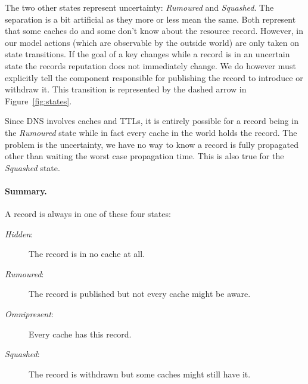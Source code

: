 \documentclass[twoside,english, a4paper]{article}
\newcommand{\powerset}{\mathopen{\mathbb{P}}\ensuremath{\,}}
\begin{document}
The two other states represent uncertainty: \emph{Rumoured} and \emph
{Squashed}. The separation is a bit artificial as they more or less 
mean the same. Both represent that some caches do and some don't 
know about the resource record. However, in our model actions (which 
are observable by the outside world) are only taken on state 
transitions. If the goal of a key changes while a record is in an 
uncertain state the records reputation does not immediately change. We 
do however must explicitly tell the component responsible for 
publishing the record to introduce or withdraw it. This transition 
is represented by the dashed arrow in Figure~\ref{fig:states}.

Since DNS involves caches and TTLs, it is entirely possible for a 
record being in the \emph{Rumoured} state while in fact every cache 
in the world holds the record. The problem is the uncertainty, we have
no way to know a record is fully propagated other than waiting the
worst case propagation time. This is also true for the \emph{Squashed}
state.

\paragraph{Summary.} A record is always in one of these four states:

\begin{description}
       \item[\emph{Hidden}:] 		
			The record is in no cache at all.
       \item[\emph{Rumoured}:] 		
			The record is published but not every cache might be aware.
       \item[\emph{Omnipresent}:]
			Every cache has this record.
       \item[\emph{Squashed}:]
			The record is withdrawn but some caches might still have it.
\end{description} 



\end{document}

